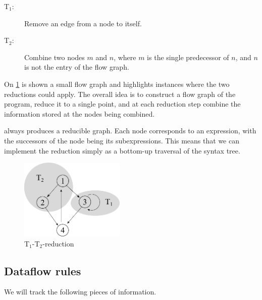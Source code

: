 \begin{description}
  \item[T$_{1}$:] Remove an edge from a node to itself.

  \item[T$_{2}$:] Combine two nodes $m$ and $n$, where $m$ is the
    single predecessor of $n$, and $n$ is not the entry of the flow
    graph.
\end{description}

On \cref{fig:t1t2-1} is shown a small flow graph and highlights
instances where the two reductions could apply.  The overall idea is
to construct a flow graph of the \LO{} program, reduce it to a single
point, and at each reduction step combine the information stored at
the nodes being combined.

\LO{} always produces a reducible graph.  Each node corresponds to an
expression, with the successors of the node being its subexpressions.
This means that we can implement the reduction simply as a bottom-up
traversal of the \LO{} syntax tree.

\begin{figure}
\begin{center}
\includegraphics[width=5cm]{img/t1t2-1.pdf}
\end{center}
\caption{T$_{1}$-T$_{2}$-reduction}
\label{fig:t1t2-1}
\end{figure}

\subsection{Dataflow rules}

We will track the following pieces of information.

